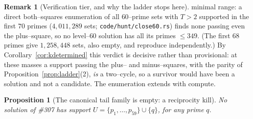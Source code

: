 \documentclass[11pt]{article}
\newtheorem{proposition}[theorem]{Proposition}
\theoremstyle{definition}
\newtheorem{remark}[theorem]{Remark}
\begin{document}
\begin{remark}[Verification tier, and why the ladder stops here]
minimal range: a direct both--squares enumeration of all $60$--prime sets with $T>2$ supported in
the first $70$ primes ($4{,}011{,}289$ sets; \texttt{code/hunt/close60.rs}) finds none passing even the
plus--square, so no level--$60$ solution has all its primes $\le349$. (The first $68$ primes give
$1{,}258{,}448$ sets, also empty, and reproduce independently.) By
Corollary~\ref{cor:kdetermined} this verdict is decisive rather than provisional: at these masses a
support passing the plus-- and minus--squares, with the parity of Proposition~\ref{prop:ladder}(2),
\emph{is} a two--cycle, so a survivor would have been a solution and not a candidate. The
enumeration extends with compute.
\end{remark}

\begin{proposition}[The canonical tail family is empty: a reciprocity kill]\label{prop:tailkill}
No solution of \#307 has support $U=\{p_1,\dots,p_{59}\}\cup\{q\}$, for any prime $q$.
\end{proposition}
\end{document}
